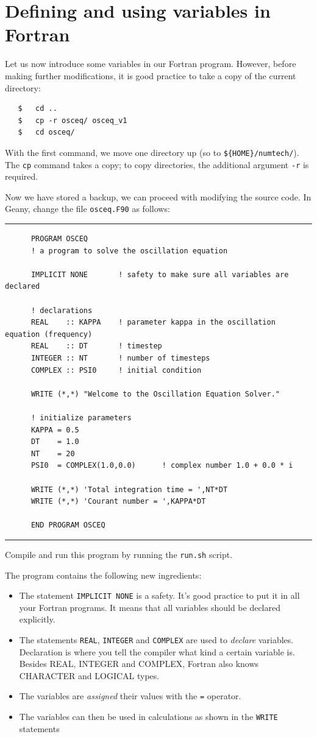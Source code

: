 \documentclass[a4paper]{article}
\begin{document}
\section{Defining and using variables in Fortran}
%
\par
Let us now introduce some variables in our Fortran program. However, before making further modifications, it is good practice to take a copy of the current directory:
%
\begin{verbatim}
   $   cd ..
   $   cp -r osceq/ osceq_v1
   $   cd osceq/
\end{verbatim}
%
With the first command, we move one directory up (so to \verb+${HOME}/numtech/+). The \verb+cp+ command takes a copy; to copy directories, the additional argument \verb+-r+ is required.
%
\par
Now we have stored a backup, we can proceed with modifying the source code. In Geany, change the file \texttt{osceq.F90} as follows:
%
{\vspace{10pt}\hrule\small\vspace*{-2pt}\begin{verbatim}
	  PROGRAM OSCEQ
	  ! a program to solve the oscillation equation
	  
	  IMPLICIT NONE       ! safety to make sure all variables are declared
	  
	  ! declarations
	  REAL    :: KAPPA    ! parameter kappa in the oscillation equation (frequency)
	  REAL    :: DT       ! timestep
	  INTEGER :: NT       ! number of timesteps
	  COMPLEX :: PSI0     ! initial condition

	  WRITE (*,*) "Welcome to the Oscillation Equation Solver."
	  
	  ! initialize parameters
	  KAPPA = 0.5
	  DT    = 1.0
	  NT    = 20
	  PSI0  = COMPLEX(1.0,0.0)      ! complex number 1.0 + 0.0 * i
	  
	  WRITE (*,*) 'Total integration time = ',NT*DT
	  WRITE (*,*) 'Courant number = ',KAPPA*DT
	  
	  END PROGRAM OSCEQ
\end{verbatim}\hrule\vspace{5pt}}
%
Compile and run this program by running the \verb+run.sh+ script.
%
\par
The program contains the following new ingredients:
%
\begin{itemize}
	\item The statement \verb+IMPLICIT NONE+ is a safety. It's good practice to put it in all your Fortran programs. It means that all variables should be declared explicitly.
	\item The statements \verb+REAL+, \verb+INTEGER+ and \verb+COMPLEX+ are used to \emph{declare} variables. Declaration is where you tell the compiler what kind a certain variable is. Besides REAL, INTEGER and COMPLEX, Fortran also knows CHARACTER and LOGICAL types.
	\item The variables are \emph{assigned} their values with the \verb+=+ operator.
	\item The variables can then be used in calculations as shown in the \verb+WRITE+ statements
\end{itemize}
\end{document}
